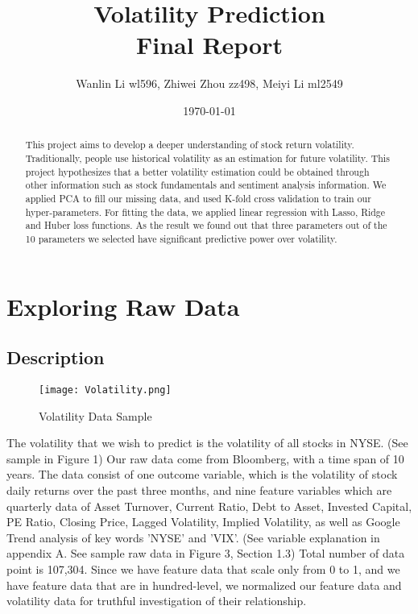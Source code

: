 \documentclass[a4paper]{article}
\title{Volatility Prediction\\Final Report}
\author{Wanlin Li wl596, Zhiwei Zhou zz498, Meiyi Li ml2549}
\date{\today}
\begin{document}
\maketitle  

\begin{abstract}
This project aims to develop a deeper understanding of stock return volatility. Traditionally, people use historical volatility as an estimation for future volatility. This project hypothesizes that a better volatility estimation could be obtained through other information such as stock fundamentals and sentiment analysis information. We applied PCA to fill our missing data, and used K-fold cross validation to train our hyper-parameters. For fitting the data, we applied linear regression with Lasso, Ridge and Huber loss functions. As the result we found out that three parameters out of the 10 parameters we selected have significant predictive power over volatility.
\end{abstract}

\section{Exploring Raw Data}
\subsection{Description}
\begin{figure}[h]
\centering
\texttt{[image: Volatility.png]}
\caption{\label{fig:scatter plot}Volatility Data Sample}
\end{figure}
The volatility that we wish to predict is the volatility of all stocks in NYSE. (See sample in Figure 1) Our raw data come from Bloomberg, with a time span of 10 years. The data consist of one outcome variable, which is the volatility of stock daily returns over the past three months, and nine feature variables which are quarterly data of Asset Turnover, Current Ratio, Debt to Asset, Invested Capital, PE Ratio, Closing Price, Lagged Volatility, Implied Volatility, as well as Google Trend analysis of key words 'NYSE' and 'VIX'. (See variable explanation in appendix A. See sample raw data in Figure 3, Section 1.3) Total number of data point is 107,304. Since we have feature data that scale only from 0 to 1, and we have feature data that are in hundred-level, we normalized our feature data and volatility data for truthful investigation of their relationship. 
\end{document}
